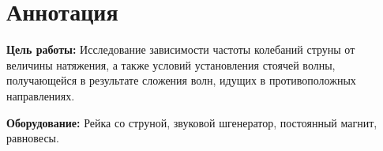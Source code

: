 \section{Аннотация}
\textbf{Цель работы:} Исследование зависимости частоты колебаний струны
от величины натяжения, а также условий установления стоячей волны,
получающейся в результате сложения волн, идущих в противоположных
направлениях.

\textbf{Оборудование:} Рейка со струной, звуковой шгенератор, постоянный
магнит, равновесы.
